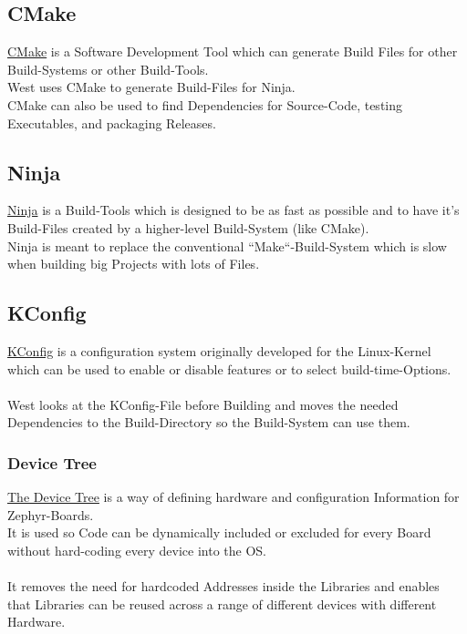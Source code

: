 \pagebreak

\subsection{CMake}

\href{https://cmake.org/}
{CMake} is a Software Development Tool which can generate Build Files for other
Build-Systems or other Build-Tools.
\\
West uses CMake to generate Build-Files for Ninja.
\\
CMake can also be used to find Dependencies for Source-Code, testing Executables,
and packaging Releases.

\subsection{Ninja}

\href{https://ninja-build.org/}{Ninja} is a Build-Tools which is designed to be
as fast as possible and to have it's Build-Files created by a higher-level
Build-System (like CMake).
\\
Ninja is meant to replace the conventional ``Make``-Build-System which is slow
when building big Projects with lots of Files.

\subsection{KConfig}

\href{https://www.kernel.org/doc/html/latest/kbuild/kconfig-language.html}
{KConfig} is a configuration system originally developed for the Linux-Kernel
which can be used to enable or disable features or to select build-time-Options.
\\
\\
West looks at the KConfig-File before Building and moves the needed Dependencies
to the Build-Directory so the Build-System can use them.

\subsubsection{Device Tree}

\href{https://docs.zephyrproject.org/2.0.0/guides/dts/index.html}
{The Device Tree} is a way of defining hardware and configuration
Information for Zephyr-Boards.
\\
It is used so Code can be dynamically included or excluded for
every Board without hard-coding every device into the OS.
\\
\\
It removes the need for hardcoded Addresses inside the Libraries and enables
that Libraries can be reused across a range of different devices with
different Hardware.

